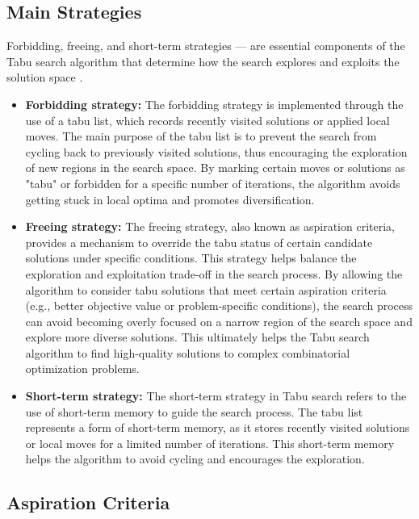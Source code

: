 \documentclass[conference]{IEEEtran}
\begin{document}
\subsection{Main Strategies}

Forbidding, freeing, and short-term strategies — are essential components of the Tabu search algorithm that determine how the search explores and exploits the solution space \cite{article}.

\begin{itemize}
\item \textbf{Forbidding strategy:} The forbidding strategy is implemented through the use of a tabu list, which records recently visited solutions or applied local moves. The main purpose of the tabu list is to prevent the search from cycling back to previously visited solutions, thus encouraging the exploration of new regions in the search space. By marking certain moves or solutions as "tabu" or forbidden for a specific number of iterations, the algorithm avoids getting stuck in local optima and promotes diversification.

\item \textbf{Freeing strategy:}
The freeing strategy, also known as aspiration criteria, provides a mechanism to override the tabu status of certain candidate solutions under specific  conditions. This strategy helps balance the exploration and exploitation trade-off in the search process. By allowing the algorithm to consider tabu solutions that meet certain aspiration criteria (e.g., better objective value or problem-specific conditions), the search process can avoid becoming overly focused on a narrow region of the search space and explore more diverse solutions. This ultimately helps the Tabu search algorithm to find high-quality solutions to complex combinatorial optimization problems.

\item \textbf{Short-term strategy:}
The short-term strategy in Tabu search refers to the use of short-term memory to guide the search process. The tabu list represents a form of short-term memory, as it stores recently visited solutions or local moves for a limited number of iterations. This short-term memory helps the algorithm to avoid cycling and encourages the exploration.

\end{itemize}

\subsection{Aspiration Criteria}
\end{document}
